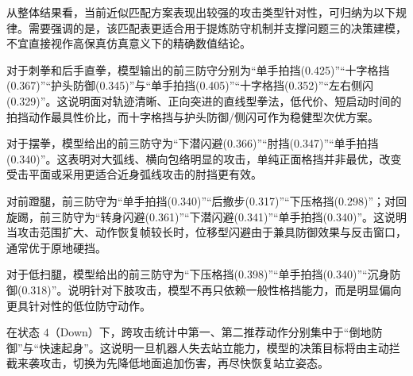 从整体结果看，当前近似匹配方案表现出较强的攻击类型针对性，可归纳为以下规律。需要强调的是，该匹配表更适合用于提炼防守机制并支撑问题三的决策建模，不宜直接视作高保真仿真意义下的精确数值结论。

对于刺拳和后手直拳，模型输出的前三防守分别为“单手拍挡(0.425)”“十字格挡(0.367)”“护头防御(0.345)”与“单手拍挡(0.405)”“十字格挡(0.352)”“左右侧闪(0.329)”。这说明面对轨迹清晰、正向突进的直线型拳法，低代价、短启动时间的拍挡动作最具性价比，而十字格挡与护头防御/侧闪可作为稳健型次优方案。

对于摆拳，模型给出的前三防守为“下潜闪避(0.366)”“肘挡(0.347)”“单手拍挡(0.340)”。这表明对大弧线、横向包络明显的攻击，单纯正面格挡并非最优，改变受击平面或采用更适合近身弧线攻击的肘挡更有效。

对前蹬腿，前三防守为“单手拍挡(0.340)”“后撤步(0.317)”“下压格挡(0.298)”；对回旋踢，前三防守为“转身闪避(0.361)”“下潜闪避(0.341)”“单手拍挡(0.340)”。这说明当攻击范围扩大、动作恢复帧较长时，位移型闪避由于兼具防御效果与反击窗口，通常优于原地硬挡。

对于低扫腿，模型给出的前三防守为“下压格挡(0.398)”“单手拍挡(0.340)”“沉身防御(0.318)”。说明针对下肢攻击，模型不再只依赖一般性格挡能力，而是明显偏向更具针对性的低位防守动作。

在状态 $4$（Down）下，跨攻击统计中第一、第二推荐动作分别集中于“倒地防御”与“快速起身”。这说明一旦机器人失去站立能力，模型的决策目标将由主动拦截来袭攻击，切换为先降低地面追加伤害，再尽快恢复站立姿态。
